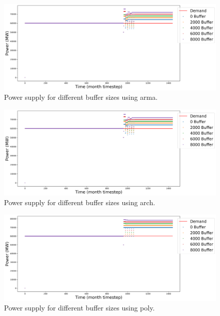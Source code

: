 \documentclass[11pt]{article}
\begin{document}
\begin{figure}[!h]
	\centering
	\includegraphics[width=\textwidth]{29-figures/29-power-buffer-arma.png} 
	\hfill
	\caption{Power supply for different buffer sizes using arma.}
	\label{fig:29-buf-arma}
\end{figure}

\begin{figure}[!h]
	\centering
	\includegraphics[width=\textwidth]{29-figures/29-power-buffer-arch.png} 
	\hfill
	\caption{Power supply for different buffer sizes using arch.}
	\label{fig:29-buf-arch}
\end{figure}

\begin{figure}[!h]
	\centering
	\includegraphics[width=\textwidth]{29-figures/29-power-buffer-poly.png} 
	\hfill
	\caption{Power supply for different buffer sizes using poly.}
	\label{fig:29-buf-poly}
\end{figure}
\end{document}
